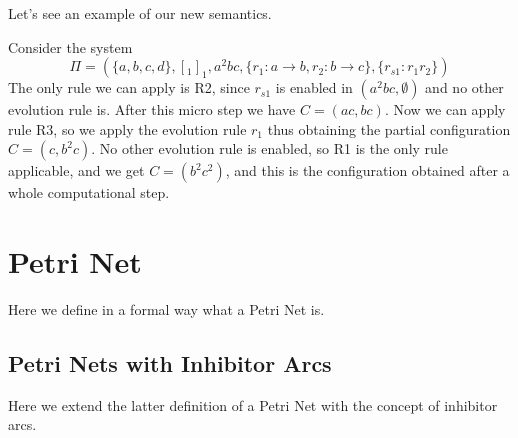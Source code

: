 Let's see an example of our new semantics.
\begin{example}
    Consider the system 
    \[ \Pi = (\{a,b,c,d\},[_1]_1,a^2bc,\{r_1:a \rightarrow b, r_2: b \rightarrow c\}, \{r_{s1}: r_1 r_2\}) \]
    The only rule we can apply is R2, since $r_{s1}$ is enabled in $(a^2bc,\emptyset)$ and no other evolution rule is.
    After this micro step we have $C = (ac,bc)$.
    Now we can apply rule R3, so we apply the evolution rule $r_1$ thus obtaining the partial configuration $C = (c,b^2c)$.
    No other evolution rule is enabled, so R1 is the only rule applicable, and we get 
    $C = (b^2c^2)$, and this is the configuration obtained after a whole computational step.
\end{example}

\section{Petri Net}

Here we define in a formal way what a Petri Net is.

\subsection{Petri Nets with Inhibitor Arcs}

Here we extend the latter definition of a Petri Net with the concept of inhibitor arcs.
